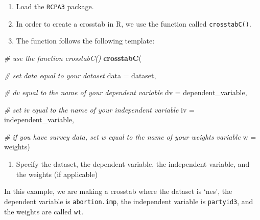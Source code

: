 \documentclass[
]{book}
\newenvironment{Shaded}{\begin{snugshade}}{\end{snugshade}}
\newcommand{\AttributeTok}[1]{\textcolor[rgb]{0.13,0.29,0.53}{#1}}
\newcommand{\CommentTok}[1]{\textcolor[rgb]{0.56,0.35,0.01}{\textit{#1}}}
\newcommand{\FunctionTok}[1]{\textcolor[rgb]{0.13,0.29,0.53}{\textbf{#1}}}
\newcommand{\NormalTok}[1]{#1}
\providecommand{\tightlist}{%
  \setlength{\itemsep}{0pt}\setlength{\parskip}{0pt}}
\begin{document}
\begin{enumerate}
\def\labelenumi{\arabic{enumi}.}
\tightlist
\item
  Load the \texttt{RCPA3} package.
\item
  In order to create a crosstab in R, we use the function called \texttt{crosstabC()}.\\
\item
  The function follows the following template:
\end{enumerate}

\begin{Shaded}
\begin{Highlighting}[]
\CommentTok{\# use the function \textasciigrave{}crosstabC()}
\FunctionTok{crosstabC}\NormalTok{(}
  
  \CommentTok{\# set \textasciigrave{}data\textasciigrave{} equal to your dataset}
  \AttributeTok{data =}\NormalTok{ dataset,}
  
  \CommentTok{\# \textasciigrave{}dv\textasciigrave{} equal to the name of your dependent variable}
  \AttributeTok{dv =}\NormalTok{ dependent\_variable, }
  
  \CommentTok{\# set \textasciigrave{}iv\textasciigrave{} equal to the name of your independent variable}
  \AttributeTok{iv =}\NormalTok{ independent\_variable, }
  
  \CommentTok{\# if you have survey data, set \textasciigrave{}w\textasciigrave{} equal to the name of your weights variable}
  \AttributeTok{w =}\NormalTok{ weights)}
\end{Highlighting}
\end{Shaded}

\begin{enumerate}
\def\labelenumi{\arabic{enumi}.}
\setcounter{enumi}{3}
\tightlist
\item
  Specify the dataset, the dependent variable, the independent variable, and the weights (if applicable)
\end{enumerate}

In this example, we are making a crosstab where the dataset is `nes', the dependent variable is \texttt{abortion.imp}, the independent variable is \texttt{partyid3}, and the weights are called \texttt{wt}.
\end{document}
